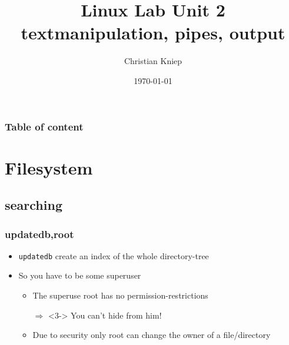 \documentclass[hyperref={pdfpagelabels=false}]{beamer}
\author{Christian Kniep}
\newcommand{\code}[1]{\colorbox{lGray}{\texttt{#1}}}
\begin{document}
\title[Linux Lab Unit 2]{Linux Lab Unit 2 \\ textmanipulation, pipes, output}  
\date[\today]{\today} 

\begin{frame}
	\titlepage
\end{frame} 

\begin{frame}
	\frametitle{Table of content}
	\tableofcontents
\end{frame} 

\section{Filesystem} 
	\subsection{searching}
		\begin{frame}
			\frametitle{updatedb,root}
			\begin{itemize}
				\item<1-> \code{updatedb} create an index of the whole directory-tree
                \item<2-> So you have to be some superuser
                \begin{itemize}
                    \item<2-> The superuse root has no permission-restrictions
                    \item[$\Rightarrow$]<3-> You can't hide from him!
                    \item<4-> Due to security only root can change the owner of a file/directory
                \end{itemize}
            \end{itemize}
        \end{frame}
\end{document}
